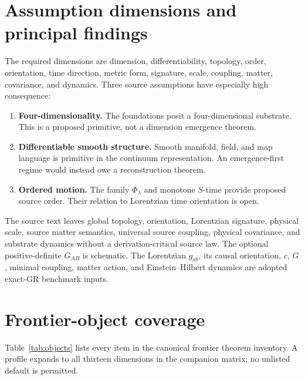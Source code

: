 \documentclass[11pt]{article}
\begin{document}
\section{Assumption dimensions and principal findings}

The required dimensions are dimension, differentiability, topology, order,
orientation, time direction, metric form, signature, scale, coupling, matter,
covariance, and dynamics.  Three source assumptions have especially high
consequence:
\begin{enumerate}
  \item \textbf{Four-dimensionality.}  The foundations posit a
  four-dimensional substrate.  This is a proposed primitive, not a dimension
  emergence theorem.
  \item \textbf{Differentiable smooth structure.}  Smooth manifold, field,
  and map language is primitive in the continuum representation.  An
  emergence-first regime would instead owe a reconstruction theorem.
  \item \textbf{Ordered motion.}  The family $\Phi_\lambda$ and monotone
  $S$-time provide proposed source order.  Their relation to Lorentzian time
  orientation is open.
\end{enumerate}

The source text leaves global topology, orientation, Lorentzian signature,
physical scale, source matter semantics, universal source coupling, physical
covariance, and substrate dynamics without a derivation-critical source law.
The optional positive-definite $G_{AB}$ is schematic.  The Lorentzian
$g_{ab}$, its causal orientation, $c$, $G$, minimal coupling, matter action,
and Einstein--Hilbert dynamics are adopted exact-GR benchmark inputs.

\section{Frontier-object coverage}

Table~\ref{tab:objects} lists every item in the canonical frontier theorem
inventory.  A profile expands to all thirteen dimensions in the companion
matrix; no unlisted default is permitted.
\end{document}

